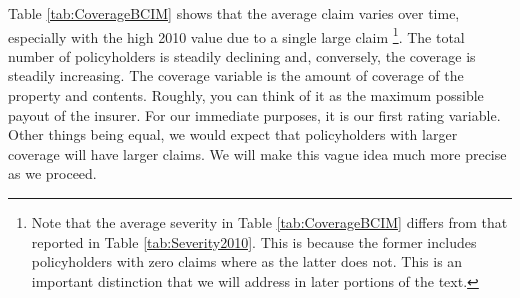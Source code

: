 \documentclass[]{book}
\let\rmarkdownfootnote\footnote%
\def\footnote{\protect\rmarkdownfootnote}
\theoremstyle{definition}
\theoremstyle{definition}
\theoremstyle{definition}
\theoremstyle{remark}
\begin{document}
Table \ref{tab:CoverageBCIM} shows that the average claim varies over
time, especially with the high 2010 value due to a single large claim
\footnote{Note that the average severity in Table \ref{tab:CoverageBCIM}
  differs from that reported in Table \ref{tab:Severity2010}. This is
  because the former includes policyholders with zero claims where as
  the latter does not. This is an important distinction that we will
  address in later portions of the text.}. The total number of
policyholders is steadily declining and, conversely, the coverage is
steadily increasing. The coverage variable is the amount of coverage of
the property and contents. Roughly, you can think of it as the maximum
possible payout of the insurer. For our immediate purposes, it is our
first rating variable. Other things being equal, we would expect that
policyholders with larger coverage will have larger claims. We will make
this vague idea much more precise as we proceed.
\end{document}

